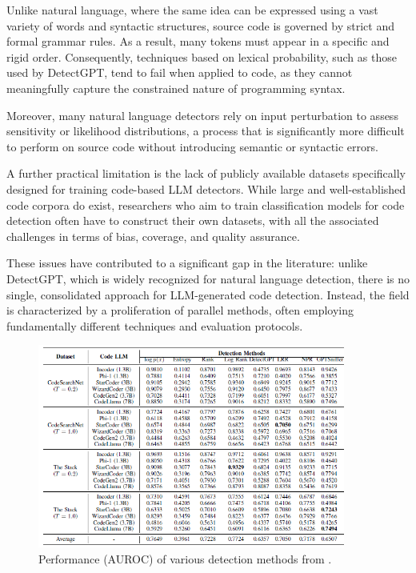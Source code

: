 Unlike natural language, where the same idea 
can be expressed using a vast variety of words 
and syntactic structures, source code is governed 
by strict and formal grammar rules. As a result, 
many tokens must appear in a specific and rigid 
order. Consequently, techniques based on lexical 
probability, such as those used by DetectGPT, 
tend to fail when applied to code, as they cannot 
meaningfully capture the constrained nature of 
programming syntax.

Moreover, many natural language detectors 
rely on input perturbation to assess sensitivity 
or likelihood distributions, a process that is 
significantly more difficult to perform on source 
code without introducing semantic or syntactic errors.

A further practical limitation is the lack of 
publicly available datasets specifically designed 
for training code-based LLM detectors. While large 
and well-established code corpora do exist, 
researchers who aim to train classification models 
for code detection often have to construct their 
own datasets, with all the associated challenges 
in terms of bias, coverage, and quality assurance.

These issues have contributed to a significant 
gap in the literature: unlike DetectGPT, which is 
widely recognized for natural language detection, 
there is no single, consolidated approach for 
LLM-generated code detection. Instead, the field 
is characterized by a proliferation of parallel 
methods, often employing fundamentally different 
techniques and evaluation protocols.



\begin{figure}[H]
    \centering
    \includegraphics[width=0.9\textwidth]{img/1/Berween.png}
    \caption{Performance (AUROC) of various detection methods from \cite{shi2024between}.}

    \label{fig:Performance (AUROC) of various detection methods}
\end{figure}
